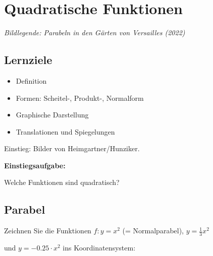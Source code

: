
\section{Quadratische Funktionen}

\textit{Bildlegende: Parabeln in den Gärten von Versailles (2022)}

\subsection*{Lernziele}

\begin{itemize}
\item Definition
\item Formen: Scheitel-, Produkt-, Normalform
\item Graphische Darstellung
\item Translationen und Spiegelungen
\end{itemize}

\newpage
Einstieg: Bilder von Heimgartner/Hunziker.


\textbf{Einstiegsaufgabe: }

Welche Funktionen sind quadratisch?


\newpage

\subsection{Parabel}

Zeichnen Sie die Funktionen $f: y=x^2$ (= Normalparabel), $y=\frac{1}{3}x^2$

und $y=-0.25\cdot{}x^2$  ins Koordinatensystem:



